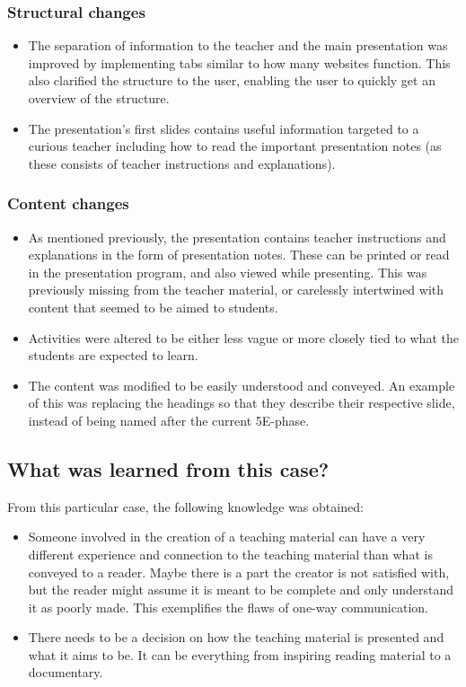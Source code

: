 \subsubsection*{Structural changes}
\begin{itemize}
    \item The separation of information to the teacher and the main presentation was improved by implementing tabs similar to how many websites function. This also clarified the structure to the user, enabling the user to quickly get an overview of the structure.
    \item The presentation's first slides contains useful information targeted to a curious teacher including how to read the important presentation notes (as these consists of teacher instructions and explanations).
\end{itemize}
\subsubsection*{Content changes}
\begin{itemize}
    \item As mentioned previously, the presentation contains teacher instructions and explanations in the form of presentation notes. These can be printed or read in the presentation program, and also viewed while presenting. This was previously missing from the teacher material, or carelessly intertwined with content that seemed to be aimed to students.
    \item Activities were altered to be either less vague or more closely tied to what the students are expected to learn.
    \item The content was modified to be easily understood and conveyed. An example of this was replacing the headings so that they describe their respective slide, instead of being named after the current 5E-phase.
\end{itemize}
\subsection{What was learned from this case?}
From this particular case, the following knowledge was obtained:
\begin{itemize}
    \item Someone involved in the creation of a teaching material can have a very different experience and connection to the teaching material than what is conveyed to a reader. Maybe there is a part the creator is not satisfied with, but the reader might assume it is meant to be complete and only understand it as poorly made. This exemplifies the flaws of one-way communication.
    \item There needs to be a decision on how the teaching material is presented and what it aims to be. It can be everything from inspiring reading material to a documentary.
\end{itemize}

